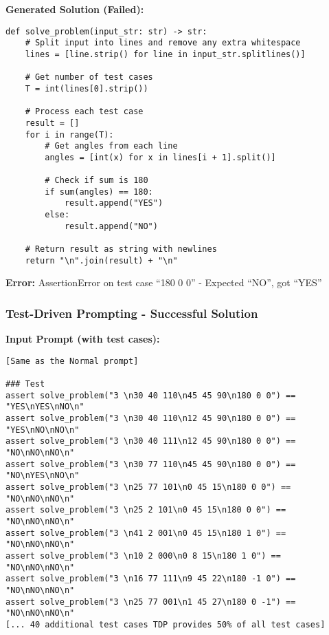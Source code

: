 \documentclass{article}
\begin{document}
\textbf{Generated Solution (Failed):}
\begin{lstlisting}
def solve_problem(input_str: str) -> str:
    # Split input into lines and remove any extra whitespace
    lines = [line.strip() for line in input_str.splitlines()]

    # Get number of test cases
    T = int(lines[0].strip())

    # Process each test case
    result = []
    for i in range(T):
        # Get angles from each line
        angles = [int(x) for x in lines[i + 1].split()]

        # Check if sum is 180
        if sum(angles) == 180:
            result.append("YES")
        else:
            result.append("NO")

    # Return result as string with newlines
    return "\n".join(result) + "\n"
\end{lstlisting}

\textbf{Error:} AssertionError on test case ``180 0 0'' - Expected ``NO'', got ``YES''

\subsubsection{Test-Driven Prompting - Successful Solution}

\textbf{Input Prompt (with test cases):}
\begin{lstlisting}
[Same as the Normal prompt]

### Test
assert solve_problem("3 \n30 40 110\n45 45 90\n180 0 0") == "YES\nYES\nNO\n"
assert solve_problem("3 \n30 40 110\n12 45 90\n180 0 0") == "YES\nNO\nNO\n"
assert solve_problem("3 \n30 40 111\n12 45 90\n180 0 0") == "NO\nNO\nNO\n"
assert solve_problem("3 \n30 77 110\n45 45 90\n180 0 0") == "NO\nYES\nNO\n"
assert solve_problem("3 \n25 77 101\n0 45 15\n180 0 0") == "NO\nNO\nNO\n"
assert solve_problem("3 \n25 2 101\n0 45 15\n180 0 0") == "NO\nNO\nNO\n"
assert solve_problem("3 \n41 2 001\n0 45 15\n180 1 0") == "NO\nNO\nNO\n"
assert solve_problem("3 \n10 2 000\n0 8 15\n180 1 0") == "NO\nNO\nNO\n"
assert solve_problem("3 \n16 77 111\n9 45 22\n180 -1 0") == "NO\nNO\nNO\n"
assert solve_problem("3 \n25 77 001\n1 45 27\n180 0 -1") == "NO\nNO\nNO\n"
[... 40 additional test cases TDP provides 50% of all test cases]
\end{lstlisting}
\end{document}
